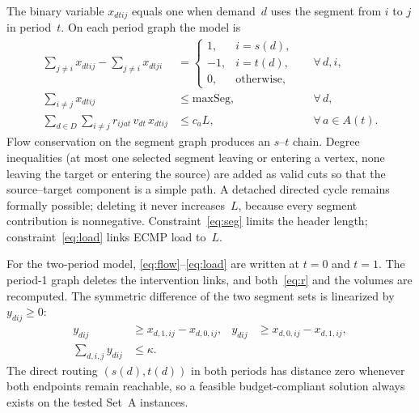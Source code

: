 The binary variable $x_{dtij}$ equals one when demand~$d$ uses the segment from $i$ to $j$
in period~$t$.
On each period graph the model is
\begin{align}
\sum_{j\neq i} x_{dtij}-\sum_{j\neq i} x_{dtji}
  &=
  \begin{cases}
  1, & i=s(d),\\
  -1, & i=t(d),\\
  0, & \text{otherwise,}
  \end{cases}
  && \forall\, d,i, \label{eq:flow}\\[0.25em]
\sum_{i\neq j} x_{dtij} &\le \mathrm{maxSeg},
  && \forall\, d, \label{eq:seg}\\[0.2em]
\sum_{d\in D}\sum_{i\neq j} r_{ijat}\, v_{dt}\, x_{dtij} &\le c_a L,
  && \forall\, a\in A(t). \label{eq:load}
\end{align}
Flow conservation on the segment graph produces an $s$--$t$ chain.
Degree inequalities (at most one selected segment leaving or entering a vertex, none leaving
the target or entering the source) are added as valid cuts so that the source--target component
is a simple path.
A detached directed cycle remains formally possible; deleting it never increases~$L$, because
every segment contribution is nonnegative.
Constraint~\eqref{eq:seg} limits the header length; constraint~\eqref{eq:load} links ECMP load
to~$L$.

For the two-period model, \eqref{eq:flow}--\eqref{eq:load} are written at $t=0$ and $t=1$.
The period-1 graph deletes the intervention links, and both~\eqref{eq:r} and the volumes are
recomputed.
The symmetric difference of the two segment sets is linearized by $y_{dij}\ge 0$:
\begin{equation}
\begin{aligned}
y_{dij}&\ge x_{d,1,ij}-x_{d,0,ij},&
y_{dij}&\ge x_{d,0,ij}-x_{d,1,ij},\\
\sum_{d,i,j} y_{dij}&\le \kappa.
\end{aligned}
\label{eq:budget}
\end{equation}
The direct routing $(s(d),t(d))$ in both periods has distance zero whenever both endpoints
remain reachable, so a feasible budget-compliant solution always exists on the tested Set~A
instances.
